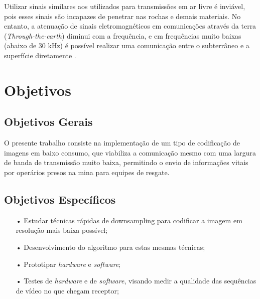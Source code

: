 Utilizar sinais similares aos utilizados para transmissões em ar livre é inviável, pois esses sinais são incapazes de penetrar nas rochas e demais materiais. No entanto, a atenuação de sinais eletromagnéticos em comunicações através da terra (\textit{Through-the-earth}) diminui com a frequência, e em frequências muito baixas (abaixo de 30 kHz) é possível realizar uma comunicação entre o subterrâneo e a superfície diretamente \cite{bandyopadhyay2010wireless}.

\section{Objetivos}
\label{OBJETIVOS}
\subsection{Objetivos Gerais}

	O presente trabalho consiste na implementação de um tipo de codificação de imagens em baixo consumo, que viabiliza a comunicação mesmo com uma largura de banda de transmissão muito baixa, permitindo o envio de informações vitais por operários presos na mina para equipes de resgate.


\subsection{Objetivos Específicos}
\begin{itemize}
\item[•]Estudar técnicas rápidas de downsampling para codificar a imagem em resolução mais baixa possível;
\item[•]Desenvolvimento do algoritmo para estas mesmas técnicas;
\item[•]Prototipar \textit{hardware} e \textit{software};
\item[•]Testes de \textit{hardware} e de \textit{software}, visando medir a qualidade das sequências de vídeo no que chegam receptor;
\end{itemize}